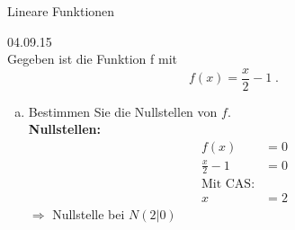 \documentclass[12pt,fleqn]{article}
\theoremstyle{aufg}
\theoremstyle{bsp}
\begin{document}
 
    \begin{flushleft}
\begin{center}Lineare Funktionen\end{center} 04.09.15 \\[2em]Gegeben ist die Funktion f mit\[f(x)=\frac{x}{2} - 1\; . \]\begin{enumerate}[a)] 
\item 
Bestimmen Sie die Nullstellen von $f$. \\ 
{\bf Nullstellen:} 
\begin{align*} 
f(x)&=0 \\ 
\frac{x}{2} - 1&=0 \\ 
\text{Mit CAS:} \\ 
x&=2\end{align*} 
$\Rightarrow$ Nullstelle bei $N(2|0)$ \\ 


\end{enumerate}
\end{flushleft}
\end{document}
